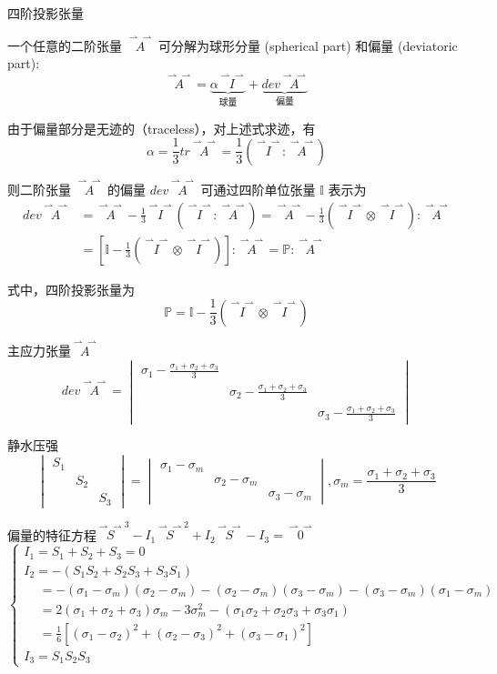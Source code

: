 \documentclass[12pt, a4paper, oneside, UTF8]{ctexbook}  %
\newcommand{\vvec}{\overset{\rightharpoonup\!\!\!\! \rightharpoonup}}
\begin{document}
\begin{defn}
    四阶投影张量

    一个任意的二阶张量 $\vvec{A}$ 可分解为球形分量 (spherical part) 和偏量 (deviatoric part):
\[
\vvec{A} = \underbrace{\alpha \vvec{I}}_{\text{球量}} + \underbrace{dev \vvec{A}}_{\text{偏量}}
\]

由于偏量部分是无迹的（traceless），对上述式求迹，有
\[
\alpha = \frac{1}{3}tr\vvec{A} = \frac{1}{3}(\vvec{I}:\vvec{A})
\]

则二阶张量 $\vvec{A}$ 的偏量 $dev\vvec{A}$ 可通过四阶单位张量 $\mathbb{I}$ 表示为
\begin{align*}
dev\vvec{A} &= \vvec{A} - \frac{1}{3}\vvec{I}(\vvec{I}:\vvec{A}) = \vvec{A} - \frac{1}{3}(\vvec{I}\otimes \vvec{I}):\vvec{A}\\
& = \left[ \mathbb{I} - \frac{1}{3}(\vvec{I}\otimes \vvec{I}) \right]:\vvec{A}= \mathbb{P}:\vvec{A}
\end{align*}

式中，四阶投影张量为
\[
\mathbb{P} = \mathbb{I} - \frac{1}{3}(\vvec{I}\otimes \vvec{I})
\]
\end{defn}
\begin{example}
    主应力张量$\vvec{A}$
    \[
    dev\vvec{A}=\begin{vmatrix}
        \sigma_1-\frac{\sigma_1+\sigma_2+\sigma_3}{3} & & \\
         &\sigma_2-\frac{\sigma_1+\sigma_2+\sigma_3}{3} & \\
         & &\sigma_3-\frac{\sigma_1+\sigma_2+\sigma_3}{3} 
    \end{vmatrix}
    \]
    
    静水压强
    \[
        \begin{vmatrix}
            S_1 & & \\
             &S_2 & \\
             & &S_3 
        \end{vmatrix}=\begin{vmatrix}
            \sigma_1-\sigma_m & & \\
             &\sigma_2-\sigma_m& \\
             & &\sigma_3-\sigma_m
        \end{vmatrix},\sigma_m=\frac{\sigma_1+\sigma_2+\sigma_3}{3}
    \]
    
    偏量的特征方程\(\vvec{S}^3-I_1\vvec{S}^2+I_2\vvec{S}-I_3=\vvec{0}\)
    \[
    \begin{cases}  
            I_1 = S_1+S_2+S_3=0\\
            I_2 = -\left( S_1S_2+S_2S_3+S_3S_1 \right)\\
            \,\quad=-(\sigma_1-\sigma_m)(\sigma_2-\sigma_m)
            -(\sigma_2-\sigma_m)(\sigma_3-\sigma_m)-(\sigma_3-\sigma_m)(\sigma_1-\sigma_m)
            \\\,\quad=2(\sigma_1+\sigma_2+\sigma_3)\sigma_m-3\sigma_m^2
            -(\sigma_1\sigma_2+\sigma_2\sigma_3+\sigma_3\sigma_1)
            \\\,\quad=\frac{1}{6}\left[(\sigma_1-\sigma_2)^2+(\sigma_2-\sigma_3)^2+(\sigma_3-\sigma_1)^2\right]
            \\I_3 = S_1S_2S_3
    \end{cases}
    \]
\end{example}
\end{document}
